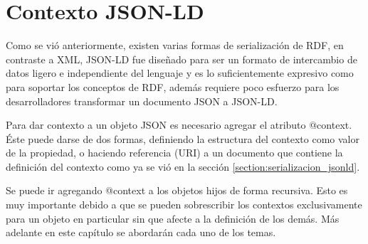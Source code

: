 \section{Contexto JSON-LD}

Como se vió anteriormente, existen varias formas de serialización de RDF, en contraste a XML, JSON-LD fue diseñado para ser un formato de intercambio de datos ligero e independiente del lenguaje y es lo suficientemente expresivo como para soportar los conceptos de RDF, además requiere poco esfuerzo para los desarrolladores transformar un documento JSON a JSON-LD\cite{JSONLDJS41:online}. 

Para dar contexto a un objeto JSON es necesario agregar el atributo @context. Éste puede darse de dos formas, definiendo la estructura del contexto como valor de la propiedad, o haciendo referencia (URI) a un documento que contiene la definición del contexto como ya se vió en la sección \ref{section:serializacion_jsonld}.

Se puede ir agregando @context a los objetos hijos de forma recursiva. Esto es muy importante debido a que se pueden sobrescribir los contextos exclusivamente para un objeto en particular sin que afecte a la definición de los demás. Más adelante en este capítulo se abordarán cada uno de los temas.



 
